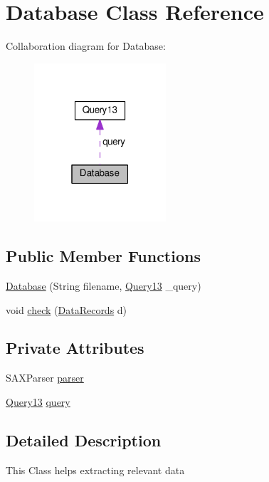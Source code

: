 \hypertarget{classDatabase}{}\section{Database Class Reference}
\label{classDatabase}


Collaboration diagram for Database\+:\nopagebreak
\begin{figure}[H]
\begin{center}
\leavevmode
\includegraphics[width=139pt]{classDatabase__coll__graph}
\end{center}
\end{figure}
\subsection*{Public Member Functions}
\begin{DoxyCompactItemize}
\item 
\hyperlink{classDatabase_a5383fafec5ba098dc8c0415fab61ad84}{Database} (String filename, \hyperlink{interfaceQuery13}{Query13} \+\_\+query)
\item 
void \hyperlink{classDatabase_a3e1bf8d878423f430f63263f22e30013}{check} (\hyperlink{classDataRecords}{Data\+Records} d)
\end{DoxyCompactItemize}
\subsection*{Private Attributes}
\begin{DoxyCompactItemize}
\item 
S\+A\+X\+Parser \hyperlink{classDatabase_a484efd6d296ceb5ae434253519632980}{parser}
\item 
\hyperlink{interfaceQuery13}{Query13} \hyperlink{classDatabase_ae6f7784250367e1154d766eb3192e38f}{query}
\end{DoxyCompactItemize}


\subsection{Detailed Description}
This Class helps extracting relevant data 

